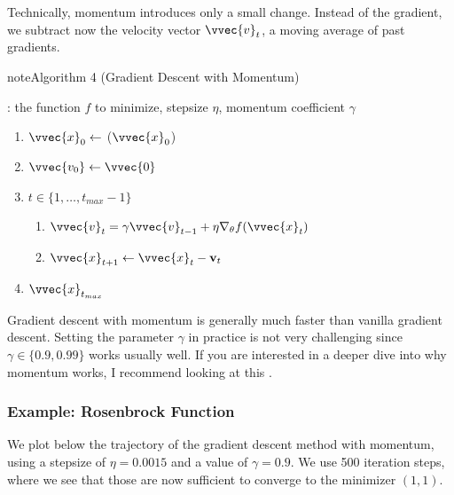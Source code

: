 \documentclass[letterpaper,10pt,english]{jupyterBook}
\begin{document}
\sphinxAtStartPar
Technically, momentum introduces only a small change. Instead of the gradient, we subtract now the velocity vector \(\vvec{v}_t\), a moving average of past gradients.
\label{optimization_numerical:algorithm-7}
\begin{sphinxadmonition}{note}{Algorithm 4 (Gradient Descent with Momentum)}



\sphinxAtStartPar
{}: the function \(f\) to minimize, step\sphinxhyphen{}size \(\eta\), momentum coefficient \(\gamma\)
\begin{enumerate}
%
\item {} 
\sphinxAtStartPar
\(\vvec{x}_0\gets\) (\(\vvec{x}_0\))

\item {} 
\sphinxAtStartPar
\(\vvec{v_0}\gets \vvec{0}\)

\item {} 
\sphinxAtStartPar
{} \(t\in\{1,\ldots,t_{max}-1\}\)
\begin{enumerate}
%
\item {} 
\sphinxAtStartPar
\(\vvec{v}_t = \gamma \vvec{v}_{t-1} + \eta \nabla_\theta f(\vvec{x}_t) \)

\item {} 
\sphinxAtStartPar
\(\vvec{x}_{t+1} \leftarrow \vvec{x}_t - \mathbf{v}_t\)

\end{enumerate}

\item {} 
\sphinxAtStartPar
{} \(\vvec{x}_{t_{max}}\)

\end{enumerate}
\end{sphinxadmonition}

\sphinxAtStartPar
Gradient descent with momentum is generally much faster than vanilla gradient descent. Setting the parameter \(\gamma \) in practice is not very challenging since \(\gamma\in\{0.9,0.99\}\) works usually well. If you are interested in a deeper dive into why momentum works, I recommend looking at this .


\subsubsection{Example: Rosenbrock Function}
\label{\detokenize{optimization_numerical:id2}}
\sphinxAtStartPar
We plot below the trajectory of the gradient descent method with momentum, using a step\sphinxhyphen{}size of \(\eta = 0.0015\) and a value of \(\gamma=0.9\). We use 500 iteration steps, where we see that those are now sufficient to converge to the minimizer \((1,1)\).
\end{document}
